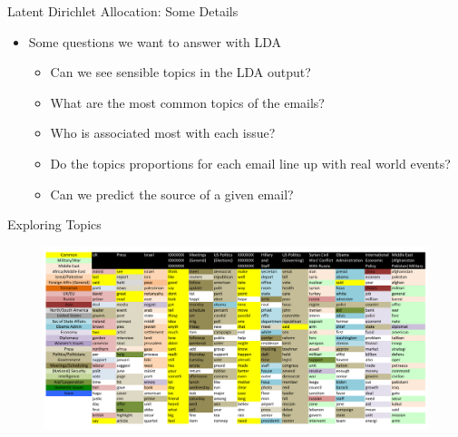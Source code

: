 \documentclass[handout,13pt]{beamer}
\begin{document}
\begin{frame}{Latent Dirichlet Allocation: Some Details}
\begin{itemize}
\item Some questions we want to answer with LDA
\begin{itemize}
\item Can we see sensible topics in the LDA output?
\item What are the most common topics of the emails?
\item Who is associated most with each issue?
\item Do the topics proportions for each email line up with real world events?
\item Can we predict the source of a given email?
\end{itemize}
\end{itemize}
\end{frame}


\begin{frame}{Exploring Topics}
\begin{figure}[h]
\centering
\includegraphics[width=0.99\linewidth]{../images/topic_words.pdf}
\label{fig:topics}
\end{figure}
\end{frame}
\end{document}
